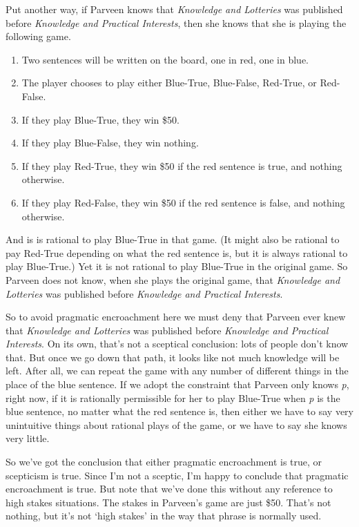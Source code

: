 \documentclass{article}
\begin{document}
Put another way, if Parveen knows that \emph{Knowledge and Lotteries} was published before \emph{Knowledge and Practical Interests}, then she knows that she is playing the following game.

\begin{enumerate}
\item Two sentences will be written on the board, one in red, one in blue.

\item The player chooses to play either Blue-True, Blue-False, Red-True, or Red-False.

\item If they play Blue-True, they win \$50.

\item If they play Blue-False, they win nothing.

\item If they play Red-True, they win \$50 if the red sentence is true, and nothing otherwise.

\item If they play Red-False, they win \$50 if the red sentence is false, and nothing otherwise.

\end{enumerate}
And is is rational to play Blue-True in that game. (It might also be rational to pay Red-True depending on what the red sentence is, but it is always rational to play Blue-True.) Yet it is not rational to play Blue-True in the original game. So Parveen does not know, when she plays the original game, that \emph{Knowledge and Lotteries} was published before \emph{Knowledge and Practical Interests}.

So to avoid pragmatic encroachment here we must deny that Parveen ever knew that \emph{Knowledge and Lotteries} was published before \emph{Knowledge and Practical Interests}. On its own, that's not a sceptical conclusion: lots of people don't know that. But once we go down that path, it looks like not much knowledge will be left. After all, we can repeat the game with any number of different things in the place of the blue sentence. If we adopt the constraint that Parveen only knows \emph{p}, right now, if it is rationally permissible for her to play Blue-True when \emph{p} is the blue sentence, no matter what the red sentence is, then either we have to say very unintuitive things about rational plays of the game, or we have to say she knows very little.

So we've got the conclusion that either pragmatic encroachment is true, or scepticism is true. Since I'm not a sceptic, I'm happy to conclude that pragmatic encroachment is true. But note that we've done this without any reference to high stakes situations. The stakes in Parveen's game are just \$50. That's not nothing, but it's not `high stakes' in the way that phrase is normally used. 
\end{document}
